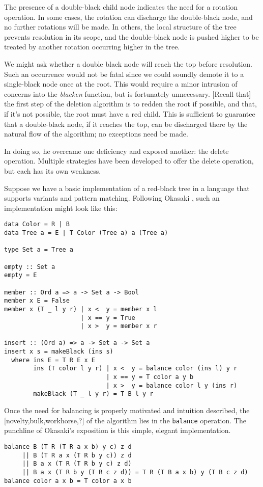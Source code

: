 \documentclass[preprint]{sigplanconf}
\begin{document}
The presence of a double-black child node indicates the need for a rotation operation. In some cases, the rotation can discharge the double-black node, and no further rotations will be made. In others, the local structure of the tree prevents resolution in its scope, and the double-black node is pushed higher to be treated by another rotation occurring higher in the tree.

We might ask whether a double black node will reach the top before resolution. Such an occurrence would not be fatal since we could soundly demote it to a single-black node once at the root. This would require a minor intrusion of concerns into the \emph{blacken} function, but is fortunately unnecessary. [Recall that] the first step of the deletion algorithm is to redden the root if possible, and that, if it's not possible, the root must have a red child. This is sufficient to guarantee that a double-black node, if it reaches the top, can be discharged there by the natural flow of the algorithm; no exceptions need be made.

In doing so, he overcame one deficiency and exposed another: the delete operation. Multiple strategies have been developed to offer the delete operation, but each has its own weakness.

Suppose we have a basic implementation of a red-black tree in a language that supports variants and pattern matching. Following Okasaki \cite{okasaki1999functional}, such an implementation might look like this:

\begin{verbatim}
data Color = R | B
data Tree a = E | T Color (Tree a) a (Tree a)

type Set a = Tree a

empty :: Set a
empty = E

member :: Ord a => a -> Set a -> Bool
member x E = False
member x (T _ l y r) | x <  y = member x l
                     | x == y = True
                     | x >  y = member x r 

insert :: (Ord a) => a -> Set a -> Set a
insert x s = makeBlack (ins s)
  where ins E = T R E x E
        ins (T color l y r) | x <  y = balance color (ins l) y r
                            | x == y = T color a y b
                            | x >  y = balance color l y (ins r)
        makeBlack (T _ l y r) = T B l y r
\end{verbatim}
Once the need for balancing is properly motivated and intuition described, the [novelty,bulk,workhorse,?] of the algorithm lies in the \texttt{balance} operation. The punchline of Okasaki's exposition is this simple, elegant implementation.
\begin{verbatim}
balance B (T R (T R a x b) y c) z d
     || B (T R a x (T R b y c)) z d
     || B a x (T R (T R b y c) z d)
     || B a x (T R b y (T R c z d)) = T R (T B a x b) y (T B c z d)
balance color a x b = T color a x b
\end{verbatim}
\end{document}
